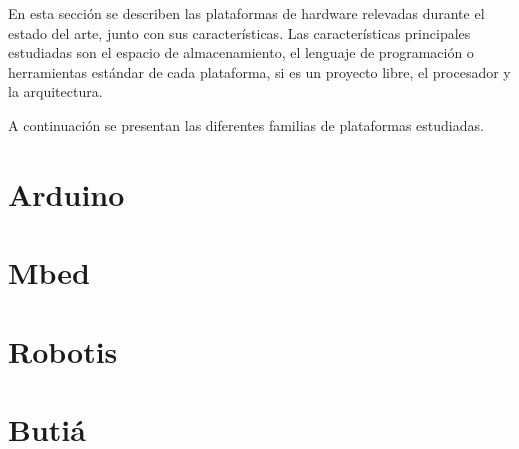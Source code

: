 
  En esta sección se describen las plataformas de hardware relevadas
durante el estado del arte, junto con sus características.
  Las características principales estudiadas 
  son el espacio de almacenamiento,
el lenguaje de programación o herramientas estándar de cada
plataforma, si es un proyecto libre, el procesador y la arquitectura.

  A continuación se presentan las diferentes familias de plataformas
estudiadas.%

\section{Arduino}


\section{Mbed}


\section{Robotis}


%

%

\section{Butiá}


%
